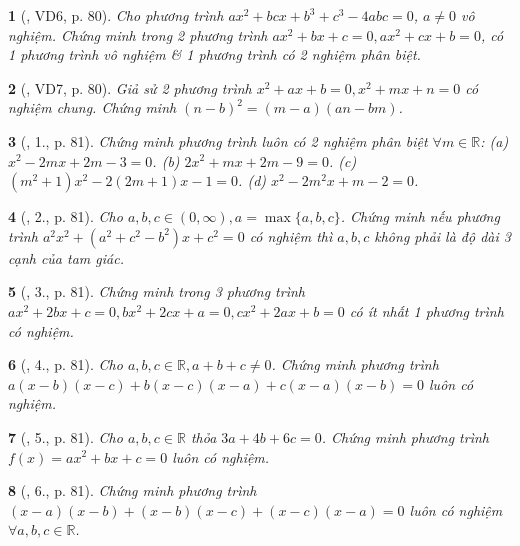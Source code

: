 \documentclass{article}
\newtheorem{baitoan}{}
\begin{document}
\begin{baitoan}[\cite{Thu_Viet_Minh_ptb2}, VD6, p. 80]
	Cho phương trình $ax^2 + bcx + b^3 + c^3 - 4abc = 0$, $a\ne0$ vô nghiệm. Chứng minh trong 2 phương trình $ax^2 + bx + c = 0,ax^2 + cx + b = 0$, có 1 phương trình vô nghiệm \& 1 phương trình có 2 nghiệm phân biệt.
\end{baitoan}

\begin{baitoan}[\cite{Thu_Viet_Minh_ptb2}, VD7, p. 80]
	Giả sử 2 phương trình $x^2 + ax + b = 0,x^2 + mx + n = 0$ có nghiệm chung. Chứng minh $(n - b)^2 = (m - a)(an - bm)$.
\end{baitoan}

\begin{baitoan}[\cite{Thu_Viet_Minh_ptb2}, 1., p. 81]
	Chứng minh phương trình luôn có 2 nghiệm phân biệt $\forall m\in\mathbb{R}$: (a) $x^2 - 2mx + 2m - 3 = 0$. (b) $2x^2 + mx + 2m - 9 = 0$. (c) $(m^2 + 1)x^2 - 2(2m + 1)x - 1 = 0$. (d) $x^2 - 2m^2x + m - 2 = 0$.
\end{baitoan}

\begin{baitoan}[\cite{Thu_Viet_Minh_ptb2}, 2., p. 81]
	Cho $a,b,c\in(0,\infty),a = \max\{a,b,c\}$. Chứng minh nếu phương trình $a^2x^2 + (a^2 + c^2 - b^2)x + c^2 = 0$ có nghiệm thì $a,b,c$ không phải là độ dài 3 cạnh của tam giác.
\end{baitoan}

\begin{baitoan}[\cite{Thu_Viet_Minh_ptb2}, 3., p. 81]
	Chứng minh trong 3 phương trình $ax^2 + 2bx + c = 0,bx^2 + 2cx + a = 0,cx^2 + 2ax + b = 0$ có ít nhất 1 phương trình có nghiệm.
\end{baitoan}

\begin{baitoan}[\cite{Thu_Viet_Minh_ptb2}, 4., p. 81]
	Cho $a,b,c\in\mathbb{R},a + b + c\ne0$. Chứng minh phương trình $a(x - b)(x - c) + b(x - c)(x - a) + c(x - a)(x - b) = 0$ luôn có nghiệm.
\end{baitoan}

\begin{baitoan}[\cite{Thu_Viet_Minh_ptb2}, 5., p. 81]
	Cho $a,b,c\in\mathbb{R}$ thỏa $3a + 4b + 6c = 0$. Chứng minh phương trình $f(x) = ax^2 + bx + c = 0$ luôn có nghiệm.
\end{baitoan}

\begin{baitoan}[\cite{Thu_Viet_Minh_ptb2}, 6., p. 81]
	Chứng minh phương trình $(x - a)(x - b) + (x - b)(x - c) + (x - c)(x - a) = 0$ luôn có nghiệm $\forall a,b,c\in\mathbb{R}$.
\end{baitoan}
\end{document}
